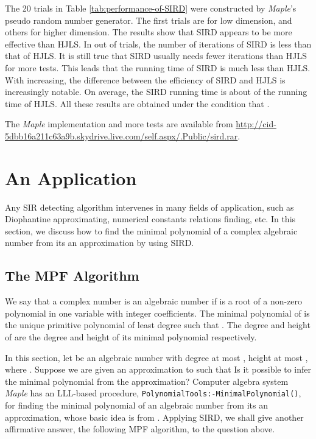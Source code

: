 \documentclass{sig-alternate}
\numberwithin{theorem}{section} \numberwithin{equation}{section}
\begin{document}
The 20 trials in Table \ref{tab:performance-of-SIRD} were
constructed by \emph{Maple}'s pseudo random number generator. The
first  trials are for low dimension, and  others for higher
dimension. The results show that SIRD appears to be more effective
than HJLS. In  out of  trials, the number of iterations of
SIRD is less than that of HJLS. It is still true that SIRD usually
needs fewer iterations than  HJLS for more tests. This leads that
the running time of SIRD is much less than HJLS.  With 
increasing, the difference between the efficiency of SIRD and HJLS
is increasingly notable. On average, the SIRD running time is about
 of the running time of HJLS. All these results are obtained
under the condition that .

The \emph{Maple} implementation and more tests are available from
{\tiny
\url{http://cid-5dbb16a211c63a9b.skydrive.live.com/self.aspx/.Public/sird.rar}.
}

\section{An Application}
\label{sec:finding-minimal-polynomial} Any SIR detecting algorithm
intervenes in many fields of application, such as Diophantine
approximating, numerical constants relations finding, etc. In this
section, we discuss how to find the minimal polynomial of a complex
algebraic number from its an approximation by using SIRD.
\subsection{The MPF Algorithm}
We say that a complex number  is an algebraic number if
 is a root of a non-zero polynomial in one variable with
integer coefficients. The minimal polynomial of  is the
unique primitive polynomial  of least degree
such that . The degree and  height of  are
the degree and  height of its minimal polynomial 
respectively.

In this section, let  be an
algebraic number with degree at most , height at most , where . Suppose we are given an approximation
 to   such that
 Is it
possible to infer the minimal polynomial from the approximation?
Computer algebra system \emph{Maple} has an LLL-based procedure,
\texttt{PolynomialTools:-MinimalPolynomial()}, for finding the
minimal polynomial of an algebraic number from its an approximation,
whose
basic idea is from \cite{Sch1984, KLL1984, KLL1988}. Applying SIRD, we shall give another affirmative answer, the
following MPF algorithm, to the question above.
\end{document}
